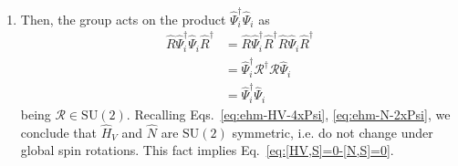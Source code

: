 \begin{tabproof}[Proof of Eq.~\eqref{eq:[HV,S]=0-[N,S]=0}: $\hat H_V$ and $\hat N$ are $\mathrm{SU}(2)$ symmetric]
\begin{enumerate}
		\[
		\begin{aligned}
			[i \bm{\theta} \cdot \hat{\mathbf{S}}, \hat \Psi_i] &= i \sum_\alpha \theta_\alpha [\hat S^\alpha, \hat \Psi_i] \\
			&= -\frac{i}{2} \sum_\alpha \theta_\alpha \tau^\alpha \hat{\Psi}_i \\
			&= -\frac{i}{2} \bm{\theta} \cdot \bm{\tau} \hat \Psi_i \, .
		\end{aligned}
		\]
		We omitted some purely algebraic passages. The second order is given by
		\[
			\begin{aligned}
				\comm{
					i \bm{\theta} \cdot \hat{\mathbf{S}}
				}{
					\comm{ i \bm{\theta} \cdot \hat{\mathbf{S}} }{ \hat{\Psi}_i }
				}
				&= \comm{
					i \bm{\theta} \cdot \hat{\mathbf{S}}
				}{
					-\frac{i}{2} (\bm{\theta} \cdot \bm{\tau}) \hat \Psi_i
				} \\
				&= -\frac{i}{2} \bm{\theta} \cdot \bm{\tau} \comm{
					i \bm{\theta} \cdot \hat{\mathbf{S}}
				}{
					\Psi_i
				} \\
				&= \frac{1}{4} (\bm{\theta} \cdot \bm{\tau})^2 \hat{\Psi}_i \, ,
			\end{aligned}
		\]
		and so on. Collecting all terms, we obtain
		\[
		\begin{aligned}
			\hat R (\bm{\theta}) \hat \Psi_i \hat R (\bm{\theta})^\dagger &= \hat \Psi_i -\frac{i}{2} \bm{\theta} \cdot \bm{\tau} \hat \Psi_i + \frac{1}{2! \times 4} (\bm{\theta} \cdot \bm{\tau})^2 \hat{\Psi}_i + \cdots \\
			&= \sum_{k=1}^\infty \frac{1}{k!} \left( - \frac{i}{2} \bm{\theta} \cdot \bm{\tau} \right)^k \hat \Psi_i \\
			&= \mathcal{R}(\bm{\theta}) \hat \Psi_i \, .
		\end{aligned}
		\]
		In the last line, we identified the series as the Taylor expansion of the exponential, recognising the expression for $\mathcal{R}(\bm{\theta})$ given in Eq.~\eqref{eq:ehm-R-exp}.
		\item Then, the group acts on the product $\hat \Psi_i^\dagger \hat \Psi_i$ as
		\[
			\begin{aligned}
				\hat R \hat \Psi_i^\dagger \hat \Psi_i \hat R^\dagger &= \hat R \hat \Psi_i^\dagger \hat R^\dagger \hat R \hat \Psi_i \hat R^\dagger \\
				&= \hat \Psi_i^\dagger \mathcal{R}^\dagger \mathcal{R} \hat \Psi_i\\
				&= \hat \Psi_i^\dagger \hat \Psi_i
			\end{aligned}
		\]
		being $\mathcal{R} \in \mathrm{SU}(2)$. Recalling Eqs.~\eqref{eq:ehm-HV-4xPsi}, \eqref{eq:ehm-N-2xPsi}, we conclude that $\hat H_V$ and $\hat N$ are $\mathrm{SU}(2)$ symmetric, i.e. do not change under global spin rotations. This fact implies Eq.~\eqref{eq:[HV,S]=0-[N,S]=0}.
	\end{enumerate}
\end{tabproof}
